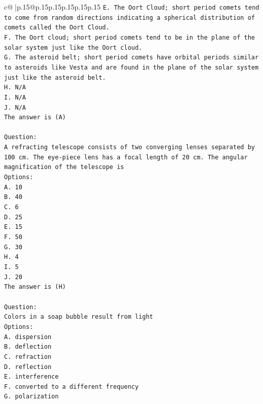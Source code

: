 \documentclass{article}
\begin{document}
{\begin{supertabular}{c@{$\;$}|p{.15\linewidth}@{}p{.15\linewidth}p{.15\linewidth}p{.15\linewidth}p{.15\linewidth}p{.15\linewidth}}
{{{\texttt{E. The Oort Cloud; short period comets tend to come from random directions indicating a spherical distribution of comets called the Oort Cloud.} \\
\texttt{F. The Oort cloud; short period comets tend to be in the plane of the solar system just like the Oort cloud.} \\
\texttt{G. The asteroid belt; short period comets have orbital periods similar to asteroids like Vesta and are found in the plane of the solar system just like the asteroid belt.} \\
\texttt{H. N/A} \\
\texttt{I. N/A} \\
\texttt{J. N/A} \\
\texttt{The answer is (A)} \\
\\ 
\texttt{Question:} \\
\texttt{A refracting telescope consists of two converging lenses separated by 100 cm. The eye{-}piece lens has a focal length of 20 cm. The angular magnification of the telescope is} \\
\texttt{Options:} \\
\texttt{A. 10} \\
\texttt{B. 40} \\
\texttt{C. 6} \\
\texttt{D. 25} \\
\texttt{E. 15} \\
\texttt{F. 50} \\
\texttt{G. 30} \\
\texttt{H. 4} \\
\texttt{I. 5} \\
\texttt{J. 20} \\
\texttt{The answer is (H)} \\
\\ 
\texttt{Question:} \\
\texttt{Colors in a soap bubble result from light} \\
\texttt{Options:} \\
\texttt{A. dispersion} \\
\texttt{B. deflection} \\
\texttt{C. refraction} \\
\texttt{D. reflection} \\
\texttt{E. interference} \\
\texttt{F. converted to a different frequency} \\
\texttt{G. polarization} \\
}}}
\end{supertabular}}
\end{document}
